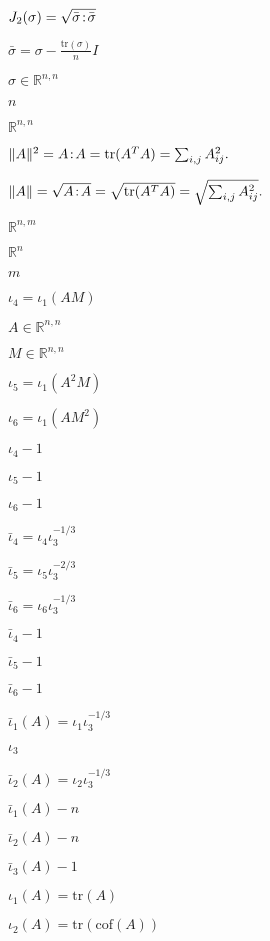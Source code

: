 \documentclass{article}
\begin{document}
$ J_2(\sigma)=\sqrt{\bar\sigma\negthinspace:\negthinspace\bar\sigma} $
\pagebreak

$\bar\sigma = \sigma - \frac{\mathrm{tr}(\sigma)}{n}I$
\pagebreak

$\sigma\in\mathbb{R}^{n,n}$
\pagebreak

$n$
\pagebreak

$\mathbb{R}^{n,n}$
\pagebreak

$ \|A\|^2 = A\negthinspace : \negthinspace A = \mathrm{tr}(A^TA) = \sum_{i,j} A_{ij}^2. $
\pagebreak

$ \|A\| = \sqrt{A\negthinspace : \negthinspace A }= \sqrt{\mathrm{tr}(A^TA)} = \sqrt{\sum_{i,j} A_{ij}^2}. $
\pagebreak

$\mathbb{R}^{n,m}$
\pagebreak

$\mathbb{R}^n$
\pagebreak

$m$
\pagebreak

$ \iota_4=\iota_1(AM) $
\pagebreak

$A\in\mathbb{R}^{n,n}$
\pagebreak

$M\in\mathbb{R}^{n,n}$
\pagebreak

$ \iota_5=\iota_1(A^2M) $
\pagebreak

$ \iota_6=\iota_1(AM^2) $
\pagebreak

$ \iota_4 - 1 $
\pagebreak

$ \iota_5 - 1 $
\pagebreak

$ \iota_6 - 1 $
\pagebreak

$\bar\iota_4=\iota_4\iota_3^{-1/3}$
\pagebreak

$\bar\iota_5=\iota_5\iota_3^{-2/3}$
\pagebreak

$\bar\iota_6=\iota_6\iota_3^{-1/3}$
\pagebreak

$ \bar\iota_4 - 1 $
\pagebreak

$ \bar\iota_5 - 1 $
\pagebreak

$ \bar\iota_6 - 1 $
\pagebreak

$ \bar\iota_1(A)=\iota_1\iota_3^{-1/3} $
\pagebreak

$\iota_3$
\pagebreak

$ \bar\iota_2(A)=\iota_2\iota_3^{-1/3} $
\pagebreak

$ \bar\iota_1(A) - n $
\pagebreak

$ \bar\iota_2(A) - n $
\pagebreak

$ \bar\iota_3(A) - 1 $
\pagebreak

$ \iota_1(A)=\mathrm{tr}(A) $
\pagebreak

$ \iota_2(A)=\mathrm{tr}(\mathrm{cof}(A)) $
\pagebreak
\end{document}
